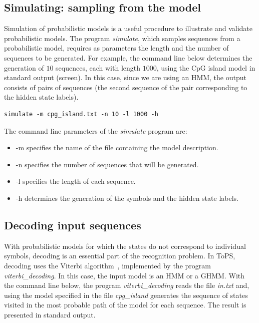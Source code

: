 \documentclass[10pt]{article}
\begin{document}
\subsection*{Simulating: sampling from the model}

Simulation of probabilistic models is a useful procedure to illustrate and validate probabilistic models.
The program \textit{simulate}, which samples  sequences from a probabilistic model,  requires as parameters the length  and the number of sequences to be generated. For example, the command line below determines the generation of $10$ sequences, each  with length $1000$, using the  CpG island model in standard output (screen). In this case, since we are using an HMM, the output consists of pairs of sequences (the second sequence of the pair  corresponding to the hidden state labels).

\begin{Verbatim}[frame=single, label={Command line}]
simulate -m cpg_island.txt -n 10 -l 1000 -h
\end{Verbatim}

The command line parameters of the \textit{simulate} program are:
\begin{itemize}
\item -m specifies the name of the file containing the model description.
\item -n specifies  the number of sequences that will be generated.
\item -l specifies the length of each sequence.
\item -h determines the generation of the symbols and the hidden state labels.
\end{itemize}

\vspace{1em}

 


\subsection*{Decoding input sequences}

With probabilistic models for which the states do not correspond to individual symbols, decoding is an essential part of the recognition problem. In ToPS, decoding uses the Viterbi algorithm~\cite{Rabiner1989}, implemented by the program \textit{viterbi\_decoding}. In this case, the input model is an HMM or a GHMM. With the command line below, the program \textit{viterbi\_decoding} reads the file \textit{in.txt} and, using the model specified in the file \textit{cpg\_island} generates the sequence of states visited in the most probable path of the model for each sequence. The result is presented in standard output.
\end{document}
